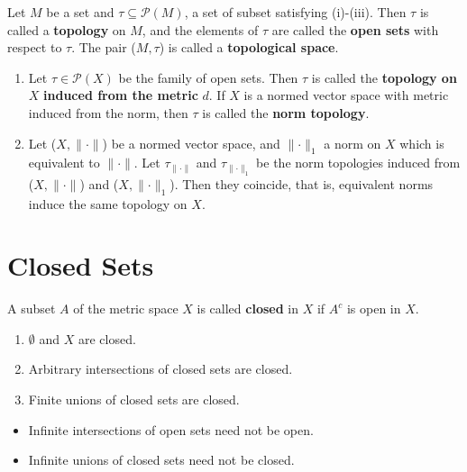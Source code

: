 Let \(M\) be a set and \(\tau \subseteq \mathcal{P}\left(M\right)\), a set of subset satisfying
(i)-(iii). Then \(\tau\) is called a \textbf{topology} on \(M\), and the elements of \(\tau\)
are called the \textbf{open sets} with respect to \(\tau\). The pair (\(M, \tau\)) is called 
a \textbf{topological space}. 

\begin{remark}
    \begin{enumerate}[label=(\alph*)]
        \item Let \(\tau \in \mathcal{P}\left(X\right)\) be the family of open sets. 
        Then \(\tau\) is called the \textbf{topology on} \(X\) \textbf{induced from the metric} \(d\). 
        If \(X\) is a normed vector space with metric induced from the norm, then \(\tau\) is called
        the \textbf{norm topology}. 
        \item  Let (\(X, \lVert \cdot \rVert\)) be a normed vector space, and \(\lVert \cdot \rVert_1\)
        a norm on \(X\) which is equivalent to \(\lVert \cdot \rVert\). Let \(\tau_{\lVert \cdot \rVert}\)
        and \(\tau_{\lVert \cdot \rVert_1}\) be the norm topologies induced from (\(X, \lVert \cdot \rVert\))
        and (\(X, \lVert \cdot \rVert_1\)). Then they coincide, that is, equivalent norms induce the 
        same topology on \(X\). 
    \end{enumerate}
\end{remark}

\section{Closed Sets}

A subset \(A\) of the metric space \(X\) is called \textbf{closed} in \(X\) if \(A^c\) is open 
in \(X\). 

\begin{proposition}
    \begin{enumerate}[label=(\roman*)]
        \item \(\emptyset\) and \(X\) are closed. 
        \item Arbitrary intersections of closed sets are closed. 
        \item Finite unions of closed sets are closed. 
    \end{enumerate}
\end{proposition}

\begin{remark}
    \begin{itemize}
        \item Infinite intersections of open sets need not be open. 
        \item Infinite unions of closed sets need not be closed. 
    \end{itemize}
\end{remark}

